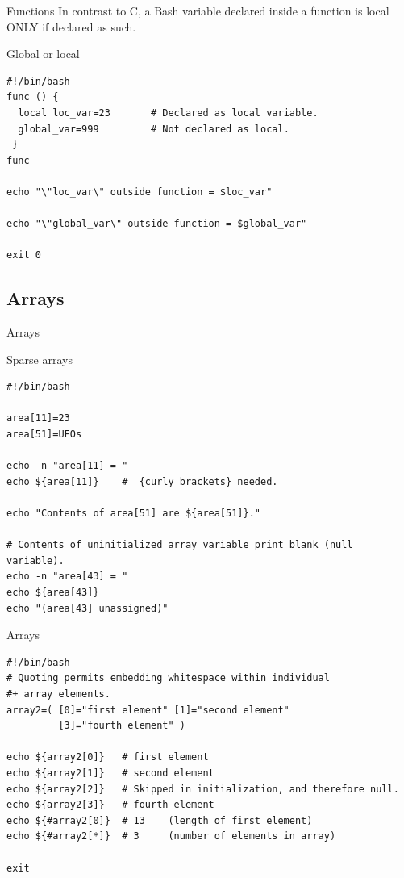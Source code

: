 \documentclass[xcolor=dvipsnames, 10pt, presentation,aspectratio=169]{beamer}
\begin{document}
\begin{frame}[label={sec:org4985c66},fragile]{Functions}
 In contrast to C, a Bash variable declared inside a function is local
ONLY if declared as such.
\begin{block}{Global or local}
\begin{verbatim}
#!/bin/bash
func () {
  local loc_var=23       # Declared as local variable.
  global_var=999         # Not declared as local.
 }  
func

echo "\"loc_var\" outside function = $loc_var"

echo "\"global_var\" outside function = $global_var"

exit 0
\end{verbatim}
\end{block}
\end{frame}
\subsection{Arrays}
\label{sec:orgb03630b}
\begin{frame}[label={sec:orged92a1b},fragile]{Arrays}
 \begin{block}{Sparse arrays}
\begin{verbatim}
#!/bin/bash

area[11]=23
area[51]=UFOs

echo -n "area[11] = "
echo ${area[11]}    #  {curly brackets} needed.

echo "Contents of area[51] are ${area[51]}."

# Contents of uninitialized array variable print blank (null variable).
echo -n "area[43] = "
echo ${area[43]}
echo "(area[43] unassigned)"

\end{verbatim}
\end{block}
\end{frame}
\begin{frame}[label={sec:org49e7789},fragile]{Arrays}
 \begin{block}{}
\begin{verbatim}
#!/bin/bash
# Quoting permits embedding whitespace within individual 
#+ array elements.
array2=( [0]="first element" [1]="second element"
         [3]="fourth element" )

echo ${array2[0]}   # first element
echo ${array2[1]}   # second element
echo ${array2[2]}   # Skipped in initialization, and therefore null.
echo ${array2[3]}   # fourth element
echo ${#array2[0]}  # 13    (length of first element)
echo ${#array2[*]}  # 3     (number of elements in array)

exit
\end{verbatim}
\end{block}
\end{frame}
\begin{frame}[label={sec:org1d0b056}]{}
\end{frame}
\end{document}
